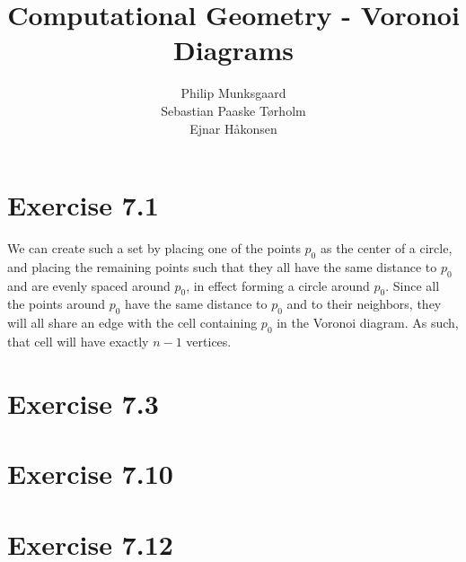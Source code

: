 \documentclass[11pt,a4paper]{article}
\title{Computational Geometry - Voronoi Diagrams}
\author{Philip Munksgaard \\ Sebastian Paaske Tørholm \\ Ejnar Håkonsen}
\begin{document}
\maketitle

\section{Exercise 7.1}

We can create such a set by placing one of the points $p_0$ as the
center of a circle, and placing the remaining points such that they
all have the same distance to $p_0$ and are evenly spaced around
$p_0$, in effect forming a circle around $p_0$. Since all the points
around $p_0$ have the same distance to $p_0$ and to their neighbors,
they will all share an edge with the cell containing $p_0$ in the
Voronoi diagram. As such, that cell will have exactly $n-1$ vertices.

\section{Exercise 7.3}

\section{Exercise 7.10}

\section{Exercise 7.12}
\end{document}

